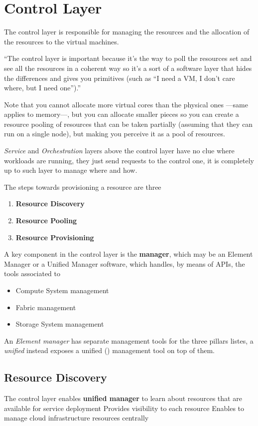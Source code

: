 \section{Control Layer}
The control layer is responsible for managing the resources and the allocation of the resources to the virtual machines.

\begin{definition}
   ``The control layer is important because it's the way to poll the resources set and see all the resources in a coherent way so it's a sort of a software layer that hides the differences and gives you primitives (such as ``I need a VM, I don't care where, but I need one'').''
\end{definition}


Note that you cannot allocate more virtual cores than the physical ones ---same applies to memory---, but you can allocate smaller pieces so you can create a resource pooling of resources that can be taken partially (assuming that they can run on a single node), but making you perceive it as a pool of resources.

\textit{Service} and \textit{Orchestration} layers above the control layer have no clue where workloads are running, they just send requests to the control one, it is completely up to such layer to manage where and how. 
\nl

The steps towards provisioning a resource are three
\begin{enumerate}
   \item \textbf{Resource Discovery}
   \item \textbf{Resource Pooling}
   \item \textbf{Resource Provisioning}
\end{enumerate}

A key component in the control layer is the \textbf{manager}, which may be an Element Manager or a Unified Manager software, which handles, by means of APIs, the tools associated to
\begin{itemize}
   \item Compute System management
   \item Fabric management
   \item Storage System management
\end{itemize}
An \textit{Element manager} has separate management tools for the three pillars listes, a \textit{unified} instead exposes a unified (\smiley) management tool on top of them.

\subsection{Resource Discovery}
The control layer enables \textbf{unified manager} to learn about resources that are available for service deployment
Provides visibility to each resource
Enables to manage cloud infrastructure resources centrally


